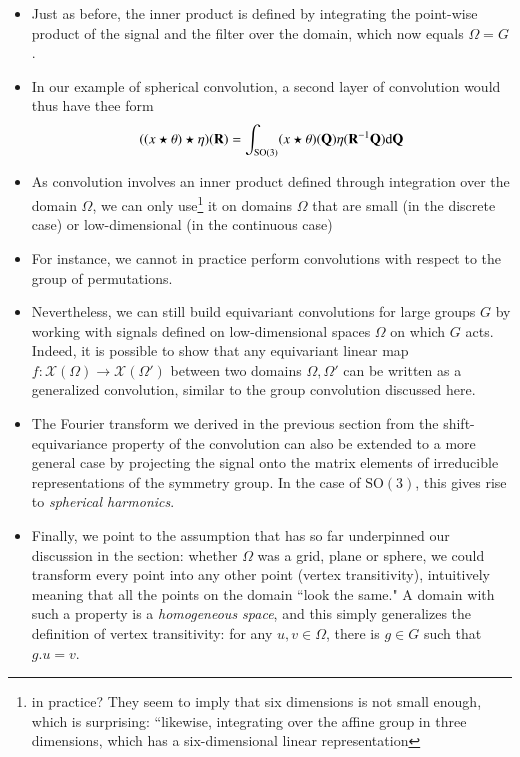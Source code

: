 \documentclass[12pt]{article}
\numberwithin{equation}{section}
\theoremstyle{definition}
\newcommand{		\cX		}	{	\mathcal{X}				}
\newcommand{		\SO		}	{	\textrm{SO}				}
\newcommand{		\B		}	{\textbf					} %
\newcommand{		\Oh		}	{	\Omega					}
\newcommand{		\1		}	{	\bm{1}					}%
\newcommand{		\matR	}	{	\B{\rm \B{R}}				}
\newcommand{		\matQ	}	{	\B{\rm \B{Q}}				}
\begin{document}
\begin{itemize}
\item Just as before, the inner product is defined by integrating the point-wise product of the signal and the filter over the domain, which now equals $\Omega = G$. 

\item In our example of spherical convolution, a second layer of convolution would thus have thee form
$$
((x \star \theta) \star \eta) (\matR) = \int_{\text{SO}(3)} ( x \star \theta) ( \matQ ) \eta ( \matR^{-1} \matQ ) \textrm{d} \matQ 
$$

\item As convolution involves an inner product defined through integration over the domain $\Omega$, we can only use\footnote{in practice? They seem to imply that six dimensions is not small enough, which is surprising: ``likewise, integrating over the affine group in three dimensions, which has a six-dimensional linear representation} it on domains $\Omega$ that are small (in the discrete case) or low-dimensional (in the continuous case)
\item For instance, we cannot in practice perform convolutions with respect to the group of permutations.
\item Nevertheless, we can still build equivariant convolutions for large groups $G$ by working with signals defined on low-dimensional spaces $\Omega$ on which $G$ acts. Indeed, it is possible to show that any equivariant linear map $f: \mathcal{X}(\Omega) \to \cX(\Oh')$ between two domains $\Omega, \Omega'$ can be written as a generalized convolution, similar to the group convolution discussed here.
\item The Fourier transform we derived in the previous section from the shift-equivariance property of the convolution can also be extended to a more general case by projecting the signal onto the matrix elements of irreducible representations of the symmetry group. In the case of $\SO(3)$, this gives rise to \emph{spherical harmonics}. 
\item Finally, we point to the assumption that has so far underpinned our discussion in the section: whether $\Omega$ was a grid, plane or sphere, we could transform every point into any other point (vertex transitivity), intuitively meaning that all the points on the domain ``look the same." A domain with such a property is a \emph{homogeneous space}, and this simply generalizes the definition of vertex transitivity: for any $u,v \in \Omega$, there is $g \in G$ such that $g.u = v$. 
\end{itemize}
\end{document}
